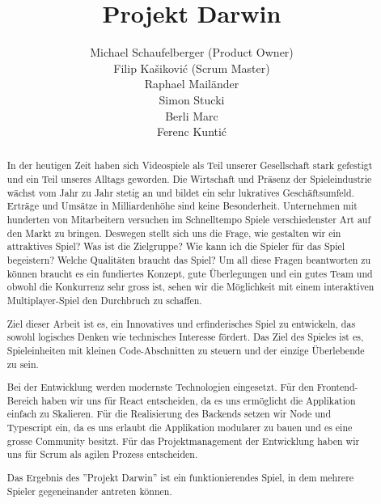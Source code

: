\documentclass[11pt,a4paper,titlepage]{article}
\author{Michael Schaufelberger (Product Owner)\\
Filip Kašiković (Scrum Master)\\
Raphael Mailänder\\
Simon Stucki\\
Berli Marc\\
Ferenc Kuntić}
\title{Projekt Darwin}
\begin{document}
\maketitle


\begin{abstract}

In der heutigen Zeit haben sich Videospiele als Teil unserer Gesellschaft stark gefestigt und ein Teil unseres Alltags geworden. Die Wirtschaft und Präsenz der Spieleindustrie wächst vom Jahr zu Jahr stetig an und bildet ein sehr lukratives Geschäftsumfeld. Erträge und Umsätze in Milliardenhöhe sind keine Besonderheit. Unternehmen mit hunderten von Mitarbeitern versuchen im Schnelltempo Spiele verschiedenster Art auf den Markt zu bringen. 
Deswegen stellt sich uns die Frage, wie gestalten wir ein attraktives Spiel? Was ist die Zielgruppe? Wie kann ich die Spieler für das Spiel begeistern? Welche Qualitäten braucht das Spiel?
Um all diese Fragen beantworten zu können braucht es ein fundiertes Konzept, gute Überlegungen und ein gutes Team und obwohl die Konkurrenz sehr gross ist, sehen wir die Möglichkeit mit einem interaktiven Multiplayer-Spiel den Durchbruch zu schaffen.

Ziel dieser Arbeit ist es, ein Innovatives und erfinderisches Spiel zu entwickeln, das sowohl logisches Denken wie technisches Interesse fördert. Das Ziel des Spieles ist es, Spieleinheiten mit kleinen Code-Abschnitten zu steuern und der einzige Überlebende zu sein.

Bei der Entwicklung werden modernste Technologien eingesetzt. Für den Frontend-Bereich haben wir uns für React entscheiden, da es uns ermöglicht die Applikation einfach zu Skalieren. Für die Realisierung des Backends setzen wir Node und Typescript ein, da es uns erlaubt die Applikation modularer zu bauen und es eine grosse Community besitzt.
Für das Projektmanagement der Entwicklung haben wir uns für Scrum als agilen Prozess entscheiden.

Das Ergebnis des ''Projekt Darwin'' ist ein funktionierendes Spiel, in dem mehrere Spieler gegeneinander antreten können.

\end{abstract}
\end{document}
